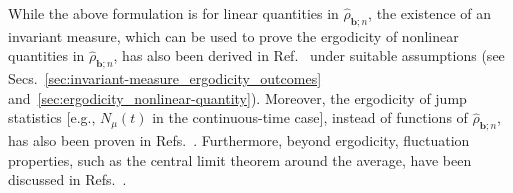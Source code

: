 \documentclass[preprint,pteplogo]{ptephy_v2}%
\numberwithin{equation}{section}
\theoremstyle{definition}
\begin{document}
While the above formulation is for linear quantities in $\hat{\rho}_{\bm{b};n}$, the existence of an invariant measure, which can be used to prove the ergodicity of nonlinear quantities in $\hat{\rho}_{\bm{b};n}$, has also been derived in Ref.~\cite{benoist2019invariant} under suitable assumptions (see Secs.~\ref{sec:invariant-measure_ergodicity_outcomes} and~\ref{sec:ergodicity_nonlinear-quantity}).
Moreover, the ergodicity of jump statistics [e.g., $N_\mu(t)$ in the continuous-time case], instead of functions of $\hat{\rho}_{\bm{b};n}$, has also been proven in Refs.~\cite{cresser2001ergodicity, kummerer2003ergodic}.
Furthermore, beyond ergodicity, fluctuation properties, such as the central limit theorem around the average, have been discussed in Refs.~\cite{attal2015central, benoist2023limit, benoist2025quantum}.
\end{document}
